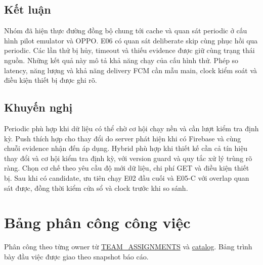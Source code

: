 \documentclass[12pt,a4paper]{report}
\newcommand{\repo}{https://github.com/ThanhTris/Seminar-IE307/blob/db8dc5f}
\newcommand{\source}[2]{\href{\repo/#1}{#2}}
\begin{document}
\section{Kết luận}
Nhóm đã hiện thực đường đồng bộ chung tới cache và quan sát periodic ở cấu hình pilot emulator và OPPO. E06 có quan sát deliberate skip cùng phục hồi qua periodic. Các lần thử bị hủy, timeout và thiếu evidence được giữ cùng trạng thái nguồn. Những kết quả này mô tả khả năng chạy của cấu hình thử. Phép so latency, năng lượng và khả năng delivery FCM cần mẫu main, clock kiểm soát và điều kiện thiết bị được ghi rõ.

\section{Khuyến nghị}
Periodic phù hợp khi dữ liệu có thể chờ cơ hội chạy nền và cần lượt kiểm tra định kỳ. Push thích hợp cho thay đổi do server phát hiện khi có Firebase và cùng chuỗi evidence nhận đến áp dụng. Hybrid phù hợp khi thiết kế cần cả tín hiệu thay đổi và cơ hội kiểm tra định kỳ, với version guard và quy tắc xử lý trùng rõ ràng. Chọn cơ chế theo yêu cầu độ mới dữ liệu, chi phí GET và điều kiện thiết bị. Sau khi có candidate, ưu tiên chạy E02 đầu cuối và E05-C với overlap quan sát được, đồng thời kiểm cửa sổ và clock trước khi so sánh.

\appendix
\chapter{Bảng phân công công việc}
Phân công theo từng owner từ \source{docs/TEAM_ASSIGNMENTS.md}{TEAM\_ASSIGNMENTS} và \source{tasks/catalog.json}{catalog}. Bảng trình bày đầu việc được giao theo snapshot báo cáo.


\clearpage
{}


\end{document}
